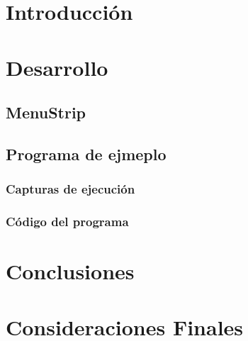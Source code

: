 \documentclass{extbook}
\begin{document}

\tableofcontents
\listoffigures
\chapter{Introducción}

\chapter{Desarrollo}
\section{MenuStrip}

\section{Programa de ejmeplo}
\subsection{Capturas de ejecución}

\subsection{Código del programa}
\chapter{Conclusiones}

\chapter{Consideraciones Finales}

\end{document}
